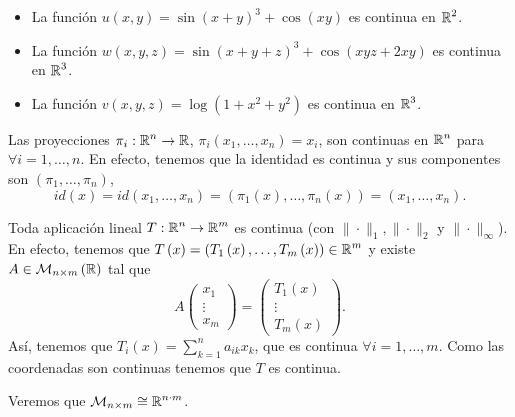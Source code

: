 \begin{eg}
	\begin{itemize}
	\item La función $\displaystyle u\left(x,y\right) = \sin\left(x+y\right)^{3} + \cos\left(xy\right) $ es continua en $\displaystyle \mathbb{R}^{2} $.
	\item La función $\displaystyle w\left(x,y,z\right) = \sin\left(x + y +z \right)^{3} + \cos\left(xyz + 2xy\right) $ es continua en $\displaystyle \mathbb{R}^{3} $.
	\item La función $\displaystyle v\left(x,y,z\right)= \log\left(1 + x^{2} +y^{2}\right) $ es continua en $\displaystyle \mathbb{R}^{3} $. 
	\end{itemize}
\end{eg}
\begin{observation}
Las proyecciones $\displaystyle \pi_{i} : \mathbb{R}^{n} \to \mathbb{R} $, $\displaystyle \pi_{i}\left(x_{1}, \ldots, x_{n}\right) = x_{i} $, son continuas en $\displaystyle \mathbb{R}^{n} $ para $\displaystyle \forall i = 1, \ldots, n $. En efecto, tenemos que la identidad es continua y sus componentes son $\displaystyle \left(\pi_{1}, \ldots, \pi_{n}\right) $,
\[id \left(x\right) = id\left(x_{1}, \ldots, x_{n}\right) = \left(\pi_{1}\left(x\right), \ldots, \pi_{n}\left(x\right)\right) = \left(x_{1}, \ldots, x_{n}\right) .\]
\end{observation}
\begin{observation}
Toda aplicación lineal $\displaystyle T : \mathbb{R}^{n} \to \mathbb{R}^{m} $ es continua (con $\displaystyle \| \cdot \|_{1}, \| \cdot \|_{2} $ y $\displaystyle \| \cdot \|_{\infty} $). En efecto, tenemos que $\displaystyle T\left(x\right) = \left(T_{1}\left(x\right), \ldots, T_{m}\left(x\right)\right) \in \mathbb{R}^{m} $ y existe $\displaystyle A \in \mathcal{M}_{n \times m}\left(\mathbb{R}\right) $ tal que 
\[A \begin{pmatrix} x_{1} \\ \vdots \\ x_{m} \end{pmatrix} = \begin{pmatrix} T_{1}\left(x\right) \\ \vdots \\ T_{m}\left(x\right) \end{pmatrix} .\]
Así, tenemos que $\displaystyle T_{i}\left(x\right) = \sum^{n}_{k = 1}a_{ik}x_{k} $, que es continua $\displaystyle \forall i = 1, \ldots, m $. Como las coordenadas son continuas tenemos que $\displaystyle T $ es continua.
\end{observation}
\begin{observation}
Veremos que $\displaystyle \mathcal{M}_{n \times m} \cong \mathbb{R}^{n \cdot m} $.
\end{observation}
